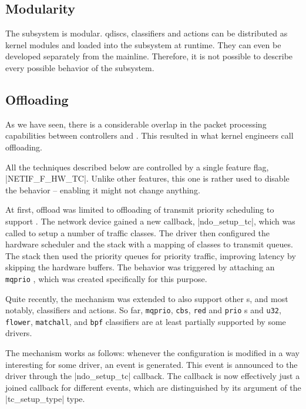 \subsection{Modularity}

The  subsystem is modular. \Acrshort{qdisc}s, classifiers and actions
can be distributed as kernel modules and loaded into the subsystem at runtime.
They can even be developed separately from the mainline. Therefore, it is not
possible to describe every possible behavior of the subsystem.

\subsection{Offloading}

As we have seen, there is a considerable overlap in the packet processing
capabilities between controllers and . This resulted in what kernel
engineers call  offloading.

All the techniques described below are controlled by a single feature flag,
\macro|NETIF_F_HW_TC|. Unlike other features, this one is rather used to
disable the behavior -- enabling it might not change anything.

At first,  offload was limited to offloading of transmit priority scheduling
to support  \cite{linux-hw-qos}. The network device gained a new
callback, \fnc|ndo_setup_tc|, which was called to setup a number of traffic
classes. The driver then configured the hardware scheduler and the stack with
a mapping of classes to transmit queues. The stack then used the priority
queues for priority traffic, improving latency by skipping the hardware
buffers. The behavior was triggered by attaching an \texttt{mqprio} \qdisc,
which was created specifically for this purpose.

Quite recently, the mechanism was extended to also support other \qdisc{}s, and
most notably, classifiers and actions. So far, \texttt{mqprio}, \texttt{cbs},
\texttt{red} and \texttt{prio} \qdisc{}s and \texttt{u32}, \texttt{flower},
\texttt{matchall}, and \texttt{bpf} classifiers are at least partially
supported by some drivers.

The mechanism works as follows: whenever the  configuration is modified in
a way interesting for some driver, an event is generated. This event is
announced to the driver through the \fnc|ndo_setup_tc| callback. The callback
is now effectively just a joined callback for different events, which are
distinguished by its argument of the \struct|tc_setup_type| type.


